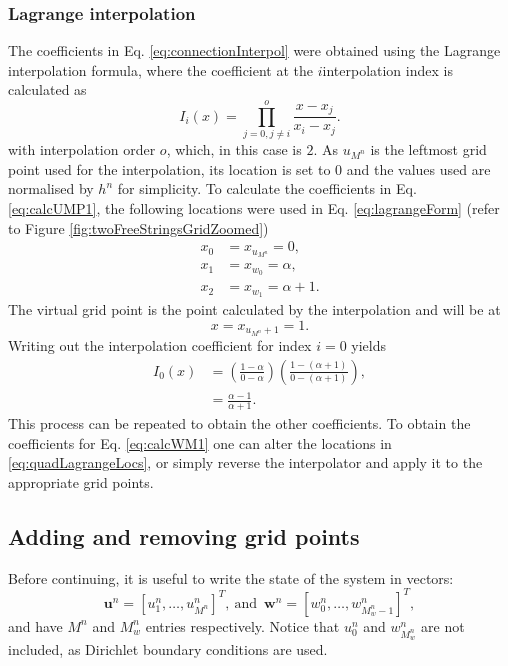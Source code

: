 \subsubsection{Lagrange interpolation}
The coefficients in Eq. \eqref{eq:connectionInterpol} were obtained using the Lagrange interpolation formula, where the coefficient at the $i$\th interpolation index is calculated as
\begin{equation}\label{eq:lagrangeForm}
    I_i(x) = \prod_{j = 0, j\neq i}^o \frac{x-x_j}{x_i-x_j}.
\end{equation}
with interpolation order $o$, which, in this case is $2$. As $u_{M^n}$ is the leftmost grid point used for the interpolation, its location is set to $0$ and the values used are normalised by $h^n$ for simplicity. To calculate the coefficients in Eq. \eqref{eq:calcUMP1}, the following locations were used in Eq. \eqref{eq:lagrangeForm} (refer to Figure \ref{fig:twoFreeStringsGridZoomed})
\begin{equation}\label{eq:quadLagrangeLocs}
    \begin{aligned}
     x_0 &= x_{u_{M^n}} = 0, \\
     x_1 &= x_{w_0} = \alpha, \\
     x_2& = x_{w_1} = \alpha + 1.
    \end{aligned}
\end{equation}
The virtual grid point is the point calculated by the interpolation and will be at
\begin{equation}
    x = x_{u_{M^n}+1} = 1.
\end{equation}
Writing out the interpolation coefficient for index $i=0$ yields
\begin{align*}
    I_0(x)&= \left(\frac{1-\alpha}{0-\alpha}\right)\left(\frac{1-(\alpha+1)}{0-(\alpha+1)}\right), \\
    &=\frac{\alpha-1}{\alpha+1}.
\end{align*}
This process can be repeated to obtain the other coefficients. To obtain the coefficients for Eq. \eqref{eq:calcWM1} one can alter the locations in \eqref{eq:quadLagrangeLocs}, or simply reverse the interpolator and apply it to the appropriate grid points. 


\subsection{Adding and removing grid points}\label{sec:addRemove}
Before continuing, it is useful to write the state of the system in vectors:
\begin{equation}
    \label{eq:separateStateVectors}
     \mathbf{u}^n = [u_1^n, \hdots, u_{M^n}^n]^T\!, \  \text{and} \ \; \mathbf{w}^n = [w_0^n, \hdots, w_{M_w^n-1}^n]^T,
\end{equation}
and have $M^n$ and $M_w^n$ entries respectively. Notice that $u_0^n$ and $w_{M_w^n}^n$ are not included, as Dirichlet boundary conditions are used.



